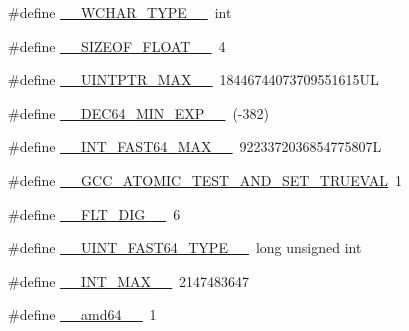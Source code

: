 \begin{DoxyCompactItemize}
\item 
\#define \hyperlink{build-analizer__host-_desktop___qt__5__9__0___g_c_c__64bit-_release_2moc__predefs_8h_a4f41dbe213ea9662c1fb0f5af562e363}{\+\_\+\+\_\+\+W\+C\+H\+A\+R\+\_\+\+T\+Y\+P\+E\+\_\+\+\_\+}~int
\item 
\#define \hyperlink{build-analizer__host-_desktop___qt__5__9__0___g_c_c__64bit-_release_2moc__predefs_8h_a4bd7bc94412d84b84388c574770b4549}{\+\_\+\+\_\+\+S\+I\+Z\+E\+O\+F\+\_\+\+F\+L\+O\+A\+T\+\_\+\+\_\+}~4
\item 
\#define \hyperlink{build-analizer__host-_desktop___qt__5__9__0___g_c_c__64bit-_release_2moc__predefs_8h_a1a2ed956349884193c07233d3cc40560}{\+\_\+\+\_\+\+U\+I\+N\+T\+P\+T\+R\+\_\+\+M\+A\+X\+\_\+\+\_\+}~18446744073709551615\+U\+L
\item 
\#define \hyperlink{build-analizer__host-_desktop___qt__5__9__0___g_c_c__64bit-_release_2moc__predefs_8h_ade7aebdae6e8389a450aac653544c33f}{\+\_\+\+\_\+\+D\+E\+C64\+\_\+\+M\+I\+N\+\_\+\+E\+X\+P\+\_\+\+\_\+}~(-\/382)
\item 
\#define \hyperlink{build-analizer__host-_desktop___qt__5__9__0___g_c_c__64bit-_release_2moc__predefs_8h_af456a5199e68c3ff20996a5bdf9b4691}{\+\_\+\+\_\+\+I\+N\+T\+\_\+\+F\+A\+S\+T64\+\_\+\+M\+A\+X\+\_\+\+\_\+}~9223372036854775807\+L
\item 
\#define \hyperlink{build-analizer__host-_desktop___qt__5__9__0___g_c_c__64bit-_release_2moc__predefs_8h_a035c056d72e677daa49cc2c7dbeed083}{\+\_\+\+\_\+\+G\+C\+C\+\_\+\+A\+T\+O\+M\+I\+C\+\_\+\+T\+E\+S\+T\+\_\+\+A\+N\+D\+\_\+\+S\+E\+T\+\_\+\+T\+R\+U\+E\+V\+A\+L}~1
\item 
\#define \hyperlink{build-analizer__host-_desktop___qt__5__9__0___g_c_c__64bit-_release_2moc__predefs_8h_a03e66bc6e427f0c968a7a0daec280729}{\+\_\+\+\_\+\+F\+L\+T\+\_\+\+D\+I\+G\+\_\+\+\_\+}~6
\item 
\#define \hyperlink{build-analizer__host-_desktop___qt__5__9__0___g_c_c__64bit-_release_2moc__predefs_8h_a3877156c4b30153ae764b0dad8d8130a}{\+\_\+\+\_\+\+U\+I\+N\+T\+\_\+\+F\+A\+S\+T64\+\_\+\+T\+Y\+P\+E\+\_\+\+\_\+}~long unsigned int
\item 
\#define \hyperlink{build-analizer__host-_desktop___qt__5__9__0___g_c_c__64bit-_release_2moc__predefs_8h_a20fcee7a683d69340d8c3d126e5a7f12}{\+\_\+\+\_\+\+I\+N\+T\+\_\+\+M\+A\+X\+\_\+\+\_\+}~2147483647
\item 
\#define \hyperlink{build-analizer__host-_desktop___qt__5__9__0___g_c_c__64bit-_release_2moc__predefs_8h_a8d57bedda11fe9ca16132e126d84669e}{\+\_\+\+\_\+amd64\+\_\+\+\_\+}~1

\end{DoxyCompactItemize}
